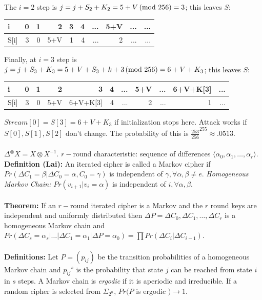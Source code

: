 The $i=2$ step is
$j= j+S_2+K_2 = 5+V \thinspace \textnormal{(mod } 256 \textnormal{)}= 3$; this leaves $S$:
\begin{center}
\begin{tabular} {|l|r|r|r|r|r|r|r|r|r|}
\hline
i & 0 & 1 & 2 & 3 & 4 & ... & 5+V & ... & ... \\
\hline
S[i] & 3 & 0 & 5+V & 1 & 4 & ... & 2 & ... & ... \\
\hline
\end{tabular}
\end{center}
Finally, at $i=3$ step is
$j= j+S_3+K_3 = 5+V+S_3+k+3 \thinspace \textnormal{(mod } 256 \textnormal{)}= 6+V+K_3$; this leaves $S$:
\begin{center}
\begin{tabular} {|l|r|r|r|r|r|r|r|r|r|r|}
\hline
i & 0 & 1 & 2 & 3 & 4 & ... & 5+V & ... & 6+V+K[3] & ... \\
\hline
S[i] & 3 & 0 & 5+V & 6+V+K[3] & 4 & ... & 2 & ... & 1 & ... \\
\hline
\end{tabular}
\end{center}
$Stream[0]= S[3]=6+V+K_3$ if initialization stops here.  Attack works if
$S[0], S[1], S[2]$
don't change.  The probability of this is ${\frac {253} {256}}^{255} \approx .0513$.
\\
\\
$\Delta^{\otimes}X =  X \otimes X^{-1}$.  $r-$round characteristic:  sequence of differences
$\langle \alpha_0, \alpha_1 , \ldots , \alpha_r \rangle$.
{\bf Definition (Lai):} An iterated cipher is called a Markov cipher if 
$Pr( \Delta C_1= \beta | \Delta C_0= \alpha, C_0= \gamma)$ is independent of 
$\gamma, \forall \alpha , \beta \ne e$.  \emph{Homogeneous Markov Chain:}
$Pr(v_{i+1} | v_i= \alpha)$ is independent of $i, \forall \alpha, \beta$.
\\
\\
{\bf Theorem:}
If an $r-$round iterated cipher is a Markov and the $r$ round keys are independent and
uniformly distributed then $\Delta P= \Delta C_0, \Delta C_1 , \ldots, \Delta C_r$
is a homogeneous Markov chain and
$Pr(\Delta C_s = \alpha_s | \ldots | \Delta C_1= \alpha_1 | \Delta P= \alpha_0)
= \prod Pr(\Delta C_i | \Delta C_{i-1})$.
\\
\\
{\bf Definitions:}
Let $P= (p_{ij})$ be the transition probabilities of a homogeneous Markov chain and
${p_{ij}}^s$ is the probability that state $j$ can be reached from state $i$ in
$s$ steps.  A Markov chain is \emph{ergodic} if it is aperiodic and irreducible.
If a random cipher is selected from $\Sigma_{2^n}$, $Pr( P$ is ergodic $) \rightarrow 1$.
